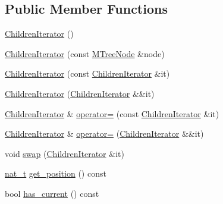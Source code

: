\subsection*{Public Member Functions}
\begin{DoxyCompactItemize}
\item 
\hyperlink{class_designar_1_1_m_tree_node_1_1_children_iterator_ab050e655c7a557a50b2cdb390063e297}{Children\+Iterator} ()
\item 
\hyperlink{class_designar_1_1_m_tree_node_1_1_children_iterator_a1fdee49d713a9e2e007d59b996660e3e}{Children\+Iterator} (const \hyperlink{class_designar_1_1_m_tree_node}{M\+Tree\+Node} \&node)
\item 
\hyperlink{class_designar_1_1_m_tree_node_1_1_children_iterator_aceb65527a47a0e0105437cb032e76001}{Children\+Iterator} (const \hyperlink{class_designar_1_1_m_tree_node_1_1_children_iterator}{Children\+Iterator} \&it)
\item 
\hyperlink{class_designar_1_1_m_tree_node_1_1_children_iterator_ab43b11e8cdbc92ce79a5e44bcd74582e}{Children\+Iterator} (\hyperlink{class_designar_1_1_m_tree_node_1_1_children_iterator}{Children\+Iterator} \&\&it)
\item 
\hyperlink{class_designar_1_1_m_tree_node_1_1_children_iterator}{Children\+Iterator} \& \hyperlink{class_designar_1_1_m_tree_node_1_1_children_iterator_a1ddbcd1ae30de226e30e56ed6947c92a}{operator=} (const \hyperlink{class_designar_1_1_m_tree_node_1_1_children_iterator}{Children\+Iterator} \&it)
\item 
\hyperlink{class_designar_1_1_m_tree_node_1_1_children_iterator}{Children\+Iterator} \& \hyperlink{class_designar_1_1_m_tree_node_1_1_children_iterator_a61d6e5b6148ec6176ccc4b6ddbdda8a2}{operator=} (\hyperlink{class_designar_1_1_m_tree_node_1_1_children_iterator}{Children\+Iterator} \&\&it)
\item 
void \hyperlink{class_designar_1_1_m_tree_node_1_1_children_iterator_ac10d8a4f756973e74dd3c5c3224c6244}{swap} (\hyperlink{class_designar_1_1_m_tree_node_1_1_children_iterator}{Children\+Iterator} \&it)
\item 
\hyperlink{namespace_designar_aa72662848b9f4815e7bf31a7cf3e33d1}{nat\+\_\+t} \hyperlink{class_designar_1_1_m_tree_node_1_1_children_iterator_a0e1a9070e700ca1dbdbc5c588193dd54}{get\+\_\+position} () const
\item 
bool \hyperlink{class_designar_1_1_m_tree_node_1_1_children_iterator_a1ce8bf462bea3f6dc7ccf236839d0867}{has\+\_\+current} () const
\item 

\end{DoxyCompactItemize}
